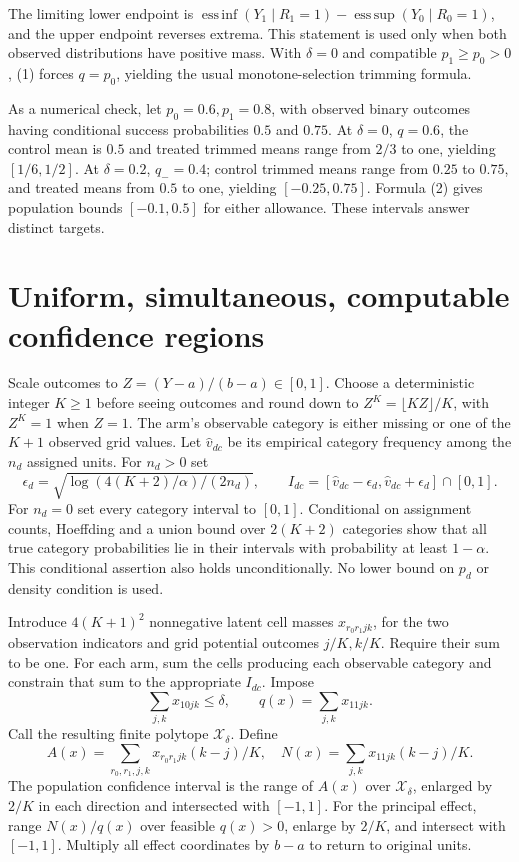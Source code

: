 \documentclass[11pt,a4paper]{article}
\begin{document}
The limiting lower endpoint is $\operatorname{ess\,inf}(Y_1\mid R_1=1)-\operatorname{ess\,sup}(Y_0\mid R_0=1)$, and the upper endpoint reverses extrema. This statement is used only when both observed distributions have positive mass. With $\delta=0$ and compatible $p_1\ge p_0>0$, (1) forces $q=p_0$, yielding the usual monotone-selection trimming formula.

As a numerical check, let $p_0=0.6,p_1=0.8$, with observed binary outcomes having conditional success probabilities $0.5$ and $0.75$. At $\delta=0$, $q=0.6$, the control mean is $0.5$ and treated trimmed means range from $2/3$ to one, yielding $[1/6,1/2]$. At $\delta=0.2$, $q_-=0.4$; control trimmed means range from $0.25$ to $0.75$, and treated means from $0.5$ to one, yielding $[-0.25,0.75]$. Formula (2) gives population bounds $[-0.1,0.5]$ for either allowance. These intervals answer distinct targets.

\section{Uniform, simultaneous, computable confidence regions}
Scale outcomes to $Z=(Y-a)/(b-a)\in[0,1]$. Choose a deterministic integer $K\ge1$ before seeing outcomes and round down to $Z^K=\lfloor KZ\rfloor/K$, with $Z^K=1$ when $Z=1$. The arm's observable category is either missing or one of the $K+1$ observed grid values. Let $\widehat v_{dc}$ be its empirical category frequency among the $n_d$ assigned units. For $n_d>0$ set
\[
 \epsilon_d=\sqrt{\log(4(K+2)/\alpha)/(2n_d)},\qquad
 I_{dc}=[\widehat v_{dc}-\epsilon_d,\widehat v_{dc}+\epsilon_d]\cap[0,1]. \tag{5}
\]
For $n_d=0$ set every category interval to $[0,1]$. Conditional on assignment counts, Hoeffding and a union bound over $2(K+2)$ categories show that all true category probabilities lie in their intervals with probability at least $1-\alpha$. This conditional assertion also holds unconditionally. No lower bound on $p_d$ or density condition is used.

Introduce $4(K+1)^2$ nonnegative latent cell masses
$x_{r_0r_1jk}$, for the two observation indicators and grid potential outcomes $j/K,k/K$. Require their sum to be one. For each arm, sum the cells producing each observable category and constrain that sum to the appropriate $I_{dc}$. Impose
\[
 \sum_{j,k}x_{10jk}\le\delta,\qquad
 q(x)=\sum_{j,k}x_{11jk}.                                 \tag{6}
\]
Call the resulting finite polytope $\mathcal X_\delta$. Define
\[
 A(x)=\sum_{r_0,r_1,j,k}x_{r_0r_1jk}(k-j)/K,
 \quad N(x)=\sum_{j,k}x_{11jk}(k-j)/K.                       \tag{7}
\]
The population confidence interval is the range of $A(x)$ over $\mathcal X_\delta$, enlarged by $2/K$ in each direction and intersected with $[-1,1]$. For the principal effect, range $N(x)/q(x)$ over feasible $q(x)>0$, enlarge by $2/K$, and intersect with $[-1,1]$. Multiply all effect coordinates by $b-a$ to return to original units.
\end{document}
